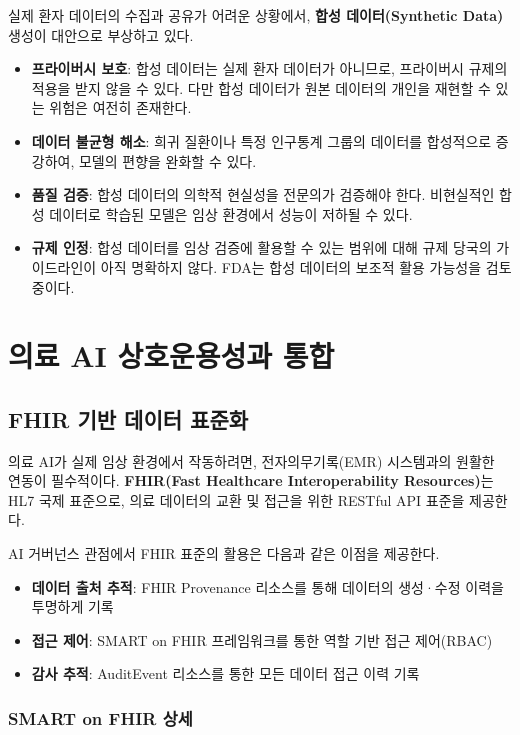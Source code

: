 실제 환자 데이터의 수집과 공유가 어려운 상황에서, \textbf{합성 데이터(Synthetic Data)} 생성이 대안으로 부상하고 있다.

\begin{itemize}
 \item \textbf{프라이버시 보호}: 합성 데이터는 실제 환자 데이터가 아니므로, 프라이버시 규제의 적용을 받지 않을 수 있다. 다만 합성 데이터가 원본 데이터의 개인을 재현할 수 있는 위험은 여전히 존재한다.
 \item \textbf{데이터 불균형 해소}: 희귀 질환이나 특정 인구통계 그룹의 데이터를 합성적으로 증강하여, 모델의 편향을 완화할 수 있다.
 \item \textbf{품질 검증}: 합성 데이터의 의학적 현실성을 전문의가 검증해야 한다. 비현실적인 합성 데이터로 학습된 모델은 임상 환경에서 성능이 저하될 수 있다.
 \item \textbf{규제 인정}: 합성 데이터를 임상 검증에 활용할 수 있는 범위에 대해 규제 당국의 가이드라인이 아직 명확하지 않다. FDA는 합성 데이터의 보조적 활용 가능성을 검토 중이다.
\end{itemize}

\section{의료 AI 상호운용성과 통합}
\label{sec:16.4}

\subsection{FHIR 기반 데이터 표준화}
\label{sec:16.4.1}

의료 AI가 실제 임상 환경에서 작동하려면, 전자의무기록(EMR) 시스템과의 원활한 연동이 필수적이다. \textbf{FHIR(Fast Healthcare Interoperability Resources)}는 HL7 국제 표준으로, 의료 데이터의 교환 및 접근을 위한 RESTful API 표준을 제공한다.

AI 거버넌스 관점에서 FHIR 표준의 활용은 다음과 같은 이점을 제공한다.
\begin{itemize}
 \item \textbf{데이터 출처 추적}: FHIR Provenance 리소스를 통해 데이터의 생성·수정 이력을 투명하게 기록
 \item \textbf{접근 제어}: SMART on FHIR 프레임워크를 통한 역할 기반 접근 제어(RBAC)
 \item \textbf{감사 추적}: AuditEvent 리소스를 통한 모든 데이터 접근 이력 기록
\end{itemize}

\subsubsection{SMART on FHIR 상세}


